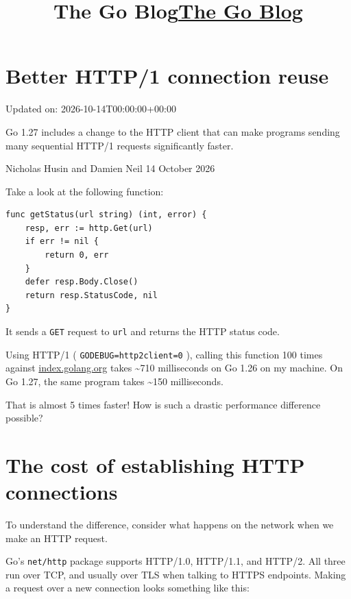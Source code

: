 \documentclass[11pt,a4paper]{article}
\title{The Go Blog}
\begin{document}
\maketitle

\section{Better HTTP/1 connection reuse}

Updated on: 2026-10-14T00:00:00+00:00

Go 1.27 includes a change to the HTTP client that can make programs sending many sequential HTTP/1 requests significantly faster.

\title{\href{https://go.dev/blog/}{The Go Blog}}

Nicholas Husin and Damien Neil
14 October 2026

Take a look at the following function:

\begin{verbatim}
func getStatus(url string) (int, error) {
    resp, err := http.Get(url)
    if err != nil {
        return 0, err
    }
    defer resp.Body.Close()
    return resp.StatusCode, nil
}
\end{verbatim}

It sends a \texttt{GET} request to \texttt{url} and returns the HTTP status code.

Using HTTP/1 ( \texttt{GODEBUG=http2client=0} ), calling this function 100 times against \href{https://index.golang.org/}{index.golang.org} takes \textasciitilde{}710 milliseconds on Go 1.26 on my machine. On Go 1.27, the same program takes \textasciitilde{}150 milliseconds.

That is almost 5 times faster! How is such a drastic performance difference possible?

\section{The cost of establishing HTTP connections}

To understand the difference, consider what happens on the network when we make an HTTP request.

Go's \texttt{net/http} package supports HTTP/1.0, HTTP/1.1, and HTTP/2. All three run over TCP, and usually over TLS when talking to HTTPS endpoints. Making a request over a new connection looks something like this:

\begin{figure}[h]
\end{figure}
\end{document}
